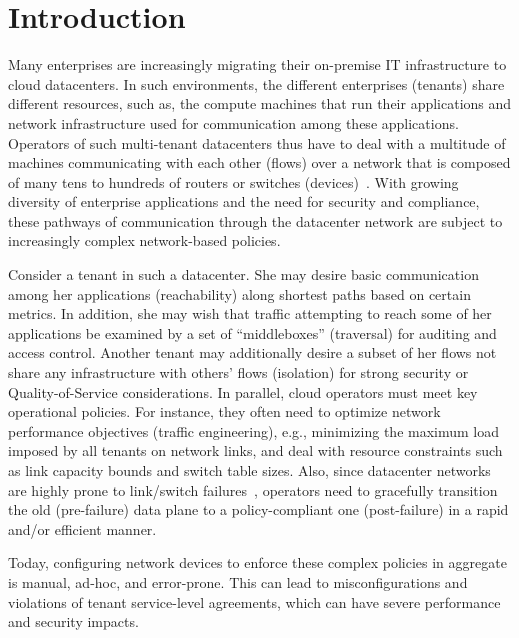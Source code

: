 \section{Introduction}

Many enterprises are increasingly migrating their on-premise IT
infrastructure to cloud datacenters. In such environments, the
different enterprises (tenants) share different resources, such as,
the compute machines that run their applications and network
infrastructure used for communication among these applications.
Operators of such multi-tenant datacenters thus have to deal with a
multitude of machines communicating with each other (flows) over a
network that is composed of many tens to hundreds of routers or
switches (devices)~\cite{mpa-imc15}. With growing diversity of
enterprise applications and the need for security and compliance,
these pathways of communication through the datacenter network are
subject to increasingly complex network-based policies.

Consider a tenant in such a datacenter. She may desire
basic communication among her applications (reachability) along
shortest paths based on certain metrics. In addition, she may wish
that traffic attempting to reach some of her applications be examined
by a set of ``middleboxes'' (traversal) for auditing and access control. 
Another tenant may additionally desire a subset of her
flows not share any infrastructure with others' flows (isolation) for
strong security or Quality-of-Service considerations.  In parallel,
cloud operators must meet key operational policies. For instance, they
often need to optimize network performance objectives (traffic
engineering), e.g., minimizing the maximum load imposed by all tenants
on network links, and deal with resource constraints such as link
capacity bounds and switch table sizes. Also, since datacenter
networks are highly prone to link/switch
failures~\cite{datacenterfailures}, operators need to gracefully
transition the old (pre-failure) data plane to a policy-compliant one
(post-failure) in a rapid and/or efficient manner.

Today, configuring network devices to enforce these complex policies
in aggregate is manual, ad-hoc, and error-prone.  This
can lead to misconfigurations and violations of tenant service-level
agreements, which can have severe performance and security
impacts.

